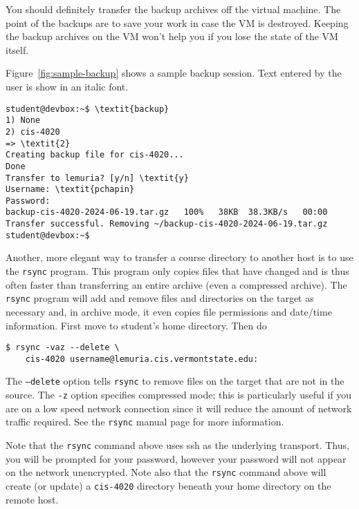 \documentclass{article}
\newcommand{\command}[1]{\texttt{#1}}
\newcommand{\filename}[1]{\texttt{#1}}
\begin{document}
You should definitely transfer the backup archives off the virtual machine. The point of the
backups are to save your work in case the VM is destroyed. Keeping the backup archives on the VM
won't help you if you lose the state of the VM itself.

Figure~\ref{fig:sample-backup} shows a sample backup session. Text entered by the user is show
in an italic font.

\begin{figure*}[t]
\begin{Verbatim}[fontsize=\small, frame=single, commandchars=\\\{\}]
student@devbox:~$ \textit{backup}
1) None
2) cis-4020
=> \textit{2}
Creating backup file for cis-4020...
Done
Transfer to lemuria? [y/n] \textit{y}
Username: \textit{pchapin}
Password: 
backup-cis-4020-2024-06-19.tar.gz   100%   38KB  38.3KB/s   00:00    
Transfer successful. Removing ~/backup-cis-4020-2024-06-19.tar.gz
student@devbox:~$
\end{Verbatim}
\caption{Sample Backup Session}
\label{fig:sample-backup}
\end{figure*}

Another, more elegant way to transfer a course directory to another host is to use the
\command{rsync} program. This program only copies files that have changed and is thus often
faster than transferring an entire archive (even a compressed archive). The \command{rsync}
program will add and remove files and directories on the target as necessary and, in archive
mode, it even copies file permissions and date/time information. First move to student's home
directory. Then do
\begin{Verbatim}
$ rsync -vaz --delete \
    cis-4020 username@lemuria.cis.vermontstate.edu:
\end{Verbatim}

The \command{--delete} option tells \command{rsync} to remove files on the target that are not in
the source. The \command{-z} option specifies compressed mode; this is particularly useful if you
are on a low speed network connection since it will reduce the amount of network traffic
required. See the \command{rsync} manual page for more information.

Note that the \command{rsync} command above uses ssh as the underlying transport. Thus, you will
be prompted for your password, however your password will not appear on the network unencrypted.
Note also that the \command{rsync} command above will create (or update) a \filename{cis-4020}
directory beneath your home directory on the remote host.
\end{document}

